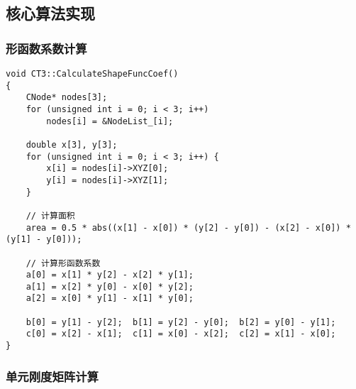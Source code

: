 \documentclass[12pt,a4paper]{article}
\begin{document}
\subsection{核心算法实现}

\subsubsection{形函数系数计算}

\begin{lstlisting}[caption=形函数系数计算实现]
void CT3::CalculateShapeFuncCoef()
{
    CNode* nodes[3];
    for (unsigned int i = 0; i < 3; i++)
        nodes[i] = &NodeList_[i];
    
    double x[3], y[3];
    for (unsigned int i = 0; i < 3; i++) {
        x[i] = nodes[i]->XYZ[0];
        y[i] = nodes[i]->XYZ[1];
    }
    
    // 计算面积
    area = 0.5 * abs((x[1] - x[0]) * (y[2] - y[0]) - (x[2] - x[0]) * (y[1] - y[0]));
    
    // 计算形函数系数
    a[0] = x[1] * y[2] - x[2] * y[1];
    a[1] = x[2] * y[0] - x[0] * y[2];
    a[2] = x[0] * y[1] - x[1] * y[0];
    
    b[0] = y[1] - y[2];  b[1] = y[2] - y[0];  b[2] = y[0] - y[1];
    c[0] = x[2] - x[1];  c[1] = x[0] - x[2];  c[2] = x[1] - x[0];
}
\end{lstlisting}

\subsubsection{单元刚度矩阵计算}
\end{document}
